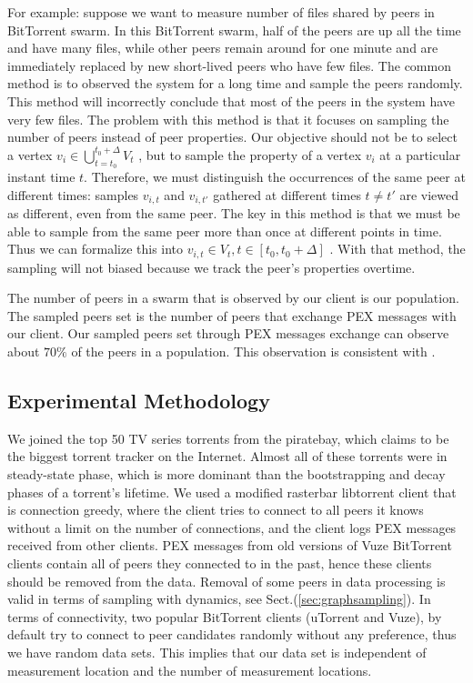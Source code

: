 For example: suppose we want to measure number of files shared by peers in BitTorrent swarm.
In this BitTorrent swarm, half of the peers are up all the time and have many files, while other peers remain around for one minute and are immediately replaced by new short-lived peers who have few files.
The common method is to observed the system for a long time and sample the peers randomly. 
This method will incorrectly conclude that most of the peers in the system have very few files.
The problem with this method is that it focuses on sampling the number of peers instead of peer properties.
Our objective should not be to select a vertex $v_i \in \bigcup^{t_0+\Delta}_{t=t_0} V_t$ , but to sample the property of a vertex $v_i$ at a particular instant time $t$.
Therefore, we must distinguish the occurrences of the same peer at different times: samples $v_{i,t}$ and $v_{i,t'}$ gathered at different times $t \neq t'$ are viewed as different, even from the same peer.
The key in this method is that we must be able to sample from the same peer more than once at different points in time.
Thus we can formalize this into $v_{i,t} \in V_t  , t \in [t_0, t_0 + \Delta]$ \cite{ stutzbach2007sampling}. 
With that method, the sampling will not biased because we track the peer's properties overtime. 

The number of peers in a swarm that is observed by our client is our population. 
The sampled peers set is the number of peers that exchange PEX messages with our client.
Our sampled peers set through PEX messages exchange can observe about $70\%$ of the peers in a population.
This observation is consistent with \cite{wu2010understanding}.

\subsection{Experimental Methodology}
We joined the top 50 TV series torrents from the piratebay, which claims to be the biggest torrent tracker on the Internet.
Almost all of these torrents were in steady-state phase, which is more dominant than the bootstrapping and decay phases of a torrent's lifetime.
We used a modified rasterbar libtorrent \cite{rasterbar} client that is connection greedy, where the client tries to connect to all peers it knows without a limit on the number of connections, and the client logs PEX messages received from other clients.
PEX messages from old versions of Vuze BitTorrent clients contain all of peers they connected to in the past, hence these clients should be removed from the data.
Removal of some peers in data processing is valid in terms of sampling with dynamics, see Sect.(\ref{sec:graphsampling}).
In terms of connectivity, two popular BitTorrent clients (uTorrent and Vuze), by default try to connect to peer candidates randomly without any preference, thus we have random data sets.
This implies that our data set is independent of measurement location and the number of measurement locations.

